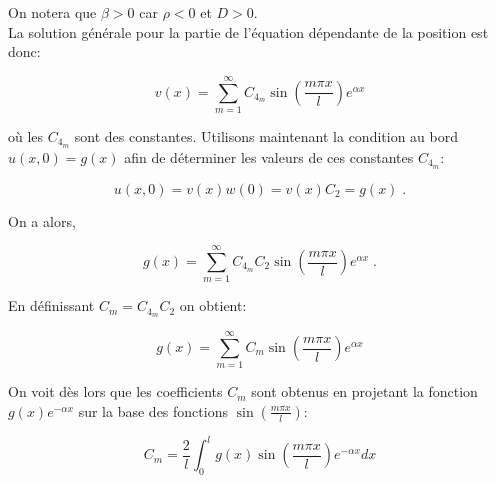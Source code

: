 \documentclass[a4paper, 12pt]{report}
\begin{document}
On notera que $\beta > 0$ car $\rho < 0$ et $D > 0$. \\
La solution générale pour la partie de l'équation dépendante de la position est
donc:

\begin{equation}
  v(x) = \sum_{m=1}^{\infty} C_{4_m} \sin \left (\frac{m \pi x}{l} \right ) e^{\alpha x}
\end{equation}

où les $C_{4_m}$ sont des constantes. Utilisons maintenant la condition au bord
$u(x,0) = g(x)$ afin de déterminer les valeurs de ces constantes $C_{4_m}$:

\begin{equation}
  u(x,0) = v(x) w(0) = v(x) C_{2} = g(x)\;.
\end{equation}

On a alors,

\begin{equation}
  g(x) = \sum_{m=1}^{\infty} C_{4_m}C_{2} \sin \left (\frac{m \pi x}{l} \right ) e^{\alpha x}\;.
\end{equation}

En définissant $C_m = C_{4_m}C_{2}$ on obtient:

\begin{equation}
  g(x) = \sum_{m=1}^{\infty} C_m \sin \left (\frac{m \pi x}{l} \right ) e^{\alpha x}
\end{equation}

On voit dès lors que les coefficients $C_m$ sont obtenus
en projetant la fonction $g(x)e^{-\alpha x}$ sur la base des fonctions $\sin \left (\frac{m \pi x}{l} \right )$:

\begin{equation}
  C_m = \frac{2}{l} \int_0^l g(x) \sin \left (\frac{m \pi x}{l} \right ) e^{-\alpha x} dx
\end{equation}



\end{document}
